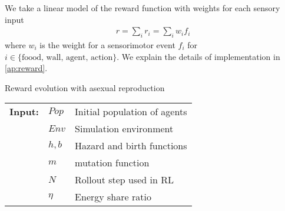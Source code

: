 We take a linear model of the reward function with weights for each sensory input
\begin{align}
  r = \sum_i r_i = \sum_i w_i f_i
  \label{eq:reward}
\end{align}
where $w_i$ is the weight for a sensorimotor event $f_i$ for $i\in{\mbox{\{foood, wall, agent,  action\}}}$. We explain the details of implementation in \cref{ap:reward}.

\begin{algorithm}
  \caption{Reward evolution with asexual reproduction}\label{alg:reward-evo}
  \begin{tabular}{lll}
    \textbf{Input:} & $Pop$ & Initial population of agents \\
                    & $Env$ & Simulation environment \\
                    & $h, b$ & Hazard and birth functions \\
                    & $m$ & mutation function \\
                    & $N$ & Rollout step used in RL \\
                    & $\eta$ & Energy share ratio
  \end{tabular}
  \begin{algorithmic}[1]
    \Loop{}
      \EndOnce{}
    \EndFor{}
       
      \EndWith{}
       
      \EndWith{}
    \EndFor{}
  \EndLoop{}
\end{algorithmic}
\end{algorithm}

